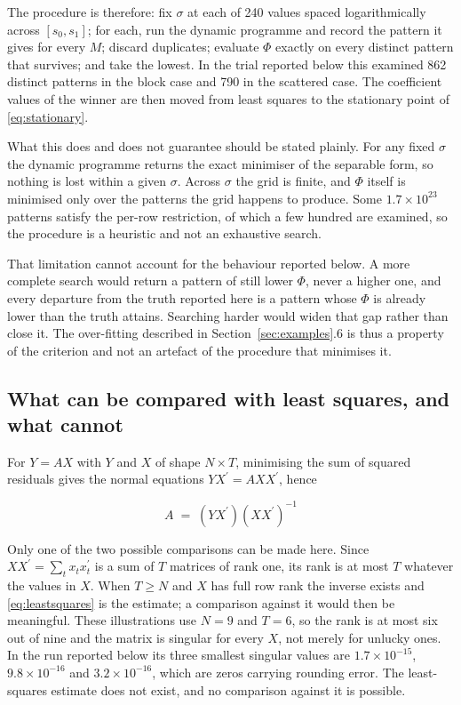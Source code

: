 The procedure is therefore: fix $\sigma$ at each of 240 values spaced logarithmically
across $[s_{0}, s_{1}]$; for each, run the dynamic programme and record the pattern it
gives for every $M$; discard duplicates; evaluate $\Phi$ exactly on every distinct
pattern that survives; and take the lowest. In the trial reported below this examined
862 distinct patterns in the block case and 790 in the scattered case. The coefficient
values of the winner are then moved from least squares to the stationary point of
\eqref{eq:stationary}.

What this does and does not guarantee should be stated plainly. For any fixed
$\sigma$ the dynamic programme returns the exact minimiser of the separable form, so
nothing is lost within a given $\sigma$. Across $\sigma$ the grid is finite, and
$\Phi$ itself is minimised only over the patterns the grid happens to produce. Some
$1.7 \times 10^{23}$ patterns satisfy the per-row restriction, of which a few hundred
are examined, so the procedure is a heuristic and not an exhaustive search.

That limitation cannot account for the behaviour reported below. A more complete
search would return a pattern of still lower $\Phi$, never a higher one, and every
departure from the truth reported here is a pattern whose $\Phi$ is already lower than
the truth attains. Searching harder would widen that gap rather than close it. The
over-fitting described in Section~\ref{sec:examples}.6 is thus a property of the
criterion and not an artefact of the procedure that minimises it.

\subsection{What can be compared with least squares, and what cannot}

For $Y = AX$ with $Y$ and $X$ of shape $N \times T$, minimising the sum of squared
residuals gives the normal equations $Y X^{\prime} = A X X^{\prime}$, hence

\begin{equation}
A \;=\; \left( Y X^{\prime} \right) \left( X X^{\prime} \right)^{-1}
\label{eq:leastsquares}
\end{equation}

Only one of the two possible comparisons can be made here. Since
$X X^{\prime} = \sum_{t} x_{t} x_{t}^{\prime}$ is a sum of $T$ matrices of rank one,
its rank is at most $T$ whatever the values in $X$. When $T \ge N$ and $X$ has full
row rank the inverse exists and \eqref{eq:leastsquares} is the estimate; a comparison
against it would then be meaningful. These illustrations use $N = 9$ and $T = 6$, so
the rank is at most six out of nine and the matrix is singular for every $X$, not
merely for unlucky ones. In the run reported below its three smallest singular values
are $1.7 \times 10^{-15}$, $9.8 \times 10^{-16}$ and $3.2 \times 10^{-16}$, which are
zeros carrying rounding error. The least-squares estimate does not exist, and no
comparison against it is possible.

